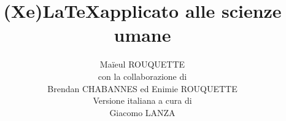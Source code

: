 






\title{(Xe)\LaTeX applicato alle scienze umane}
\author{Maïeul ROUQUETTE \\ con la collaborazione di \\ Brendan CHABANNES ed Enimie ROUQUETTE \\ Versione italiana a cura di \\ Giacomo LANZA}